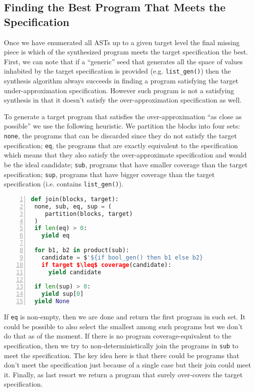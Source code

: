 \documentclass[review, sigplan]{acmart}
\begin{document}
\subsection{Finding the Best Program That Meets the Specification}
Once we have enumerated all ASTs up to a given target level the
final missing piece is which of the synthesized program
meets the target specification the best.
First, we can note that if a ``generic'' seed that generates
all the space of values inhabited by the target specification is provided
(e.g. \lstinline[language=caml, basicstyle=\small\ttfamily, mathescape]|list_gen()|)
then the synthesis algorithm always succeeds in finding a program satisfying the
target under-approximation specification.
However such program is not a satisfying synthesis in that it doesn't satisfy
the over-approximation specification as well.

To generate a target program that satisfies the over-approximation
``as close as possible'' we use the following heuristic.
We partition the blocks into four sets:
\lstinline[language=caml, basicstyle=\small\ttfamily, mathescape]|none|,
the programs that can be discarded since they do not satisfy the target
specification;
\lstinline[language=caml, basicstyle=\small\ttfamily, mathescape]|eq|,
the programs that are exactly equivalent to the specification which
means that they also satisfy the over-approximate specification and
would be the ideal candidate;
\lstinline[language=caml, basicstyle=\small\ttfamily, mathescape]|sub|,
programs that have smaller coverage than the target specification;
\lstinline[language=caml, basicstyle=\small\ttfamily, mathescape]|sup|,
programs that have bigger coverage than the target specification
(i.e. contains \lstinline[language=caml, basicstyle=\small\ttfamily, mathescape]|list_gen()|).

\begin{lstlisting}[language=Python, basicstyle=\small\ttfamily, mathescape, numbers=left, numbersep=3pt]
def join(blocks, target):
 none, sub, eq, sup = (
    partition(blocks, target)
 )
 if len(eq) > 0:
   yield eq

 for b1, b2 in product(sub):
   candidate = $'${if bool_gen() then b1 else b2}
   if target $\leq$ coverage(candidate):
     yield candidate

 if len(sup) > 0:
   yield sup[0]
 yield None
\end{lstlisting}

If \lstinline[language=caml, basicstyle=\small\ttfamily, mathescape]|eq| is non-empty,
then we are done and return the first program in such set. It could be possible
to also select the smallest among such programs but we don't do that as of the moment.
If there is no program coverage-equivalent to the specification, then
we try to non-deterministically join the programs
in \lstinline[language=caml, basicstyle=\small\ttfamily, mathescape]|sub| to meet
the specification.
The key idea here is that there could be programs that don't meet
the specification just because of a single case but their join
could meet it.
Finally, as last resort we return a program that surely over-covers
the target specification.
\end{document}
